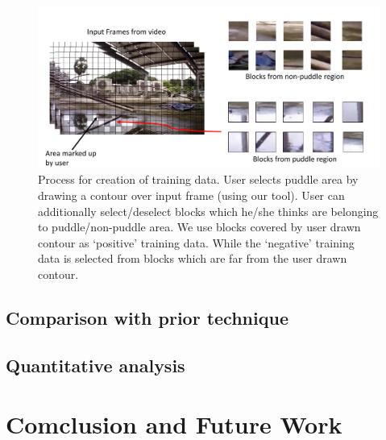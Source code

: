 \documentclass[times,10pt,twocolumn,letterpaper]{article}
\begin{document}
\begin{figure}[h!]
\centering
\includegraphics[width=\linewidth]{images/trainingData.pdf}
\caption{Process for creation of training data. User selects puddle area by
drawing a contour over input frame (using our tool). User can additionally
select/deselect blocks which he/she thinks are belonging to puddle/non-puddle
area. We use blocks covered by user drawn contour as `positive' training data.
While the `negative' training data is selected from blocks which are far from
the user drawn contour.}
\label{fig:training}
\end{figure}

\subsection{Comparison with prior technique}
\subsection{Quantitative analysis}
\section{Comclusion and Future Work}



\end{document}
